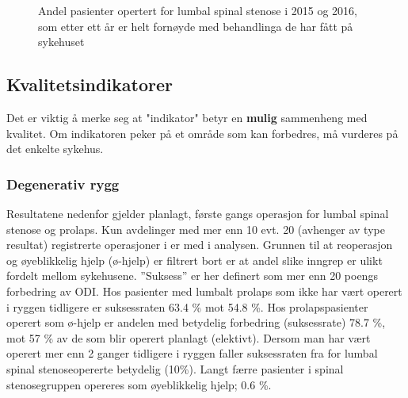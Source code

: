 \documentclass [norsk,a4paper,twoside]{article}\usepackage[]{graphicx}\usepackage[]{color}
\begin{document}
\begin{figure}[h] 
\caption{Andel pasienter opertert for lumbal spinal stenose i 2015 og 2016, som etter ett år er helt fornøyde med behandlinga de har fått på sykehuset}
\label{fig:FornoydAvdSS}
\end{figure}

\clearpage




      



\subsection{Kvalitetsindikatorer}
Det er viktig å merke seg at "indikator"  betyr en \textbf{mulig} sammenheng 
med kvalitet. Om indikatoren peker på et område som kan forbedres, må vurderes på det enkelte sykehus.

\subsubsection{Degenerativ rygg}





      
      Resultatene nedenfor gjelder planlagt, første gangs operasjon for lumbal spinal stenose og prolaps.
Kun avdelinger med mer enn 10 evt. 20 (avhenger av type resultat) registrerte operasjoner i er med i
analysen.
Grunnen til at reoperasjon og øyeblikkelig hjelp (ø-hjelp)
er filtrert bort er at andel slike inngrep er ulikt fordelt mellom sykehusene. 
      ''Suksess'' er her definert som mer enn 20 poengs forbedring av ODI. 
Hos pasienter med lumbalt prolaps som ikke har vært operert i ryggen tidligere er 
suksessraten 63.4 \% mot 54.8 \%. Hos prolapspasienter operert som ø-hjelp er andelen med betydelig forbedring 
(suksessrate)  78.7 \%, mot 57 \% av de som blir 
operert planlagt (elektivt). Dersom man har vært operert mer enn 2 ganger tidligere i
ryggen faller suksessraten fra  for lumbal spinal stenoseopererte betydelig (10\%). Langt færre pasienter i spinal stenosegruppen opereres som øyeblikkelig hjelp; 0.6 \%.  
\end{document}

